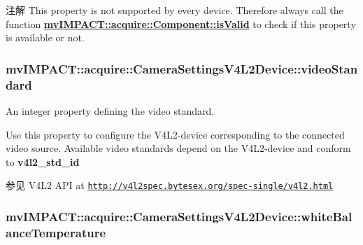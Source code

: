 \begin{DoxyNote}{注解}
This property is not supported by every device. Therefore always call the function {\bfseries \hyperlink{classmv_i_m_p_a_c_t_1_1acquire_1_1_component_ac51e55e7e046101f3c6119d84123abd5}{mv\+I\+M\+P\+A\+C\+T\+::acquire\+::\+Component\+::is\+Valid}} to check if this property is available or not. 
\end{DoxyNote}
\hypertarget{classmv_i_m_p_a_c_t_1_1acquire_1_1_camera_settings_v4_l2_device_aeb57b67f5eac2c20462ce1d2cc33e3b3}{
\subsubsection[{video\+Standard}]{ mv\+I\+M\+P\+A\+C\+T\+::acquire\+::\+Camera\+Settings\+V4\+L2\+Device\+::video\+Standard}}\label{classmv_i_m_p_a_c_t_1_1acquire_1_1_camera_settings_v4_l2_device_aeb57b67f5eac2c20462ce1d2cc33e3b3}


An integer property defining the video standard. 

Use this property to configure the V4\+L2-\/device corresponding to the connected video source. Available video standards depend on the V4\+L2-\/device and conform to {\bfseries v4l2\+\_\+std\+\_\+id} \begin{DoxySeeAlso}{参见}
V4\+L2 A\+P\+I at \href{http://v4l2spec.bytesex.org/spec-single/v4l2.html}{\tt http\+://v4l2spec.\+bytesex.\+org/spec-\/single/v4l2.\+html} 
\end{DoxySeeAlso}
\hypertarget{classmv_i_m_p_a_c_t_1_1acquire_1_1_camera_settings_v4_l2_device_a61292095dc6ec3982c235d053f1b6a92}{
\subsubsection[{white\+Balance\+Temperature}]{ mv\+I\+M\+P\+A\+C\+T\+::acquire\+::\+Camera\+Settings\+V4\+L2\+Device\+::white\+Balance\+Temperature}}\label{classmv_i_m_p_a_c_t_1_1acquire_1_1_camera_settings_v4_l2_device_a61292095dc6ec3982c235d053f1b6a92}


